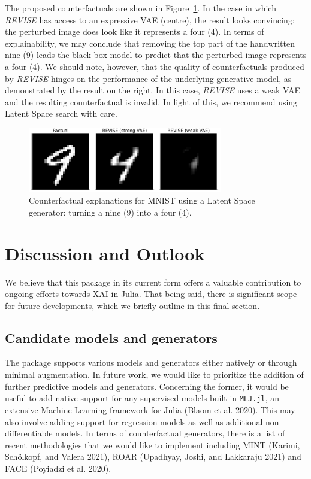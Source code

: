 \documentclass{juliacon}
\begin{document}
The proposed counterfactuals are shown in Figure~\ref{fig-mnist}. In the
case in which \emph{REVISE} has access to an expressive VAE (centre),
the result looks convincing: the perturbed image does look like it
represents a four (4). In terms of explainability, we may conclude that
removing the top part of the handwritten nine (9) leads the black-box
model to predict that the perturbed image represents a four (4). We
should note, however, that the quality of counterfactuals produced by
\emph{REVISE} hinges on the performance of the underlying generative
model, as demonstrated by the result on the right. In this case,
\emph{REVISE} uses a weak VAE and the resulting counterfactual is
invalid. In light of this, we recommend using Latent Space search with
care.

\begin{figure}

{\centering \includegraphics[width=3.33333in,height=1.11111in]{www/mnist_9to4_latent.png}

}

\caption{\label{fig-mnist}Counterfactual explanations for MNIST using a
Latent Space generator: turning a nine (9) into a four (4).}

\end{figure}

\hypertarget{sec-outlook}{%
\section{Discussion and Outlook}\label{sec-outlook}}

We believe that this package in its current form offers a valuable
contribution to ongoing efforts towards XAI in Julia. That being said,
there is significant scope for future developments, which we briefly
outline in this final section.

\hypertarget{candidate-models-and-generators}{%
\subsection{Candidate models and
generators}\label{candidate-models-and-generators}}

The package supports various models and generators either natively or
through minimal augmentation. In future work, we would like to
prioritize the addition of further predictive models and generators.
Concerning the former, it would be useful to add native support for any
supervised models built in \texttt{MLJ.jl}, an extensive Machine
Learning framework for Julia (Blaom et al. 2020). This may also involve
adding support for regression models as well as additional
non-differentiable models. In terms of counterfactual generators, there
is a list of recent methodologies that we would like to implement
including MINT (Karimi, Schölkopf, and Valera 2021), ROAR (Upadhyay,
Joshi, and Lakkaraju 2021) and FACE (Poyiadzi et al. 2020).
\end{document}
